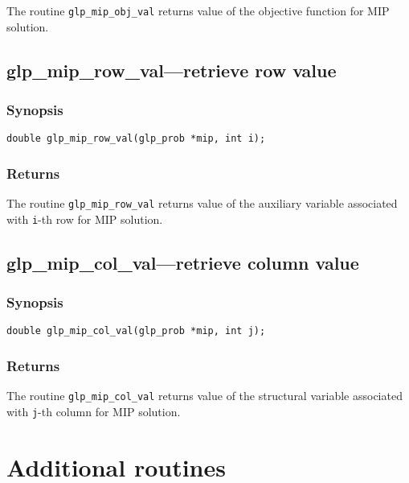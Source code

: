 The routine \verb|glp_mip_obj_val| returns value of the objective
function for MIP solution.

\subsection{glp\_mip\_row\_val---retrieve row value}

\subsubsection*{Synopsis}

\begin{verbatim}
double glp_mip_row_val(glp_prob *mip, int i);
\end{verbatim}

\subsubsection*{Returns}

The routine \verb|glp_mip_row_val| returns value of the auxiliary
variable associated with \verb|i|-th row for MIP solution.

\subsection{glp\_mip\_col\_val---retrieve column value}

\subsubsection*{Synopsis}

\begin{verbatim}
double glp_mip_col_val(glp_prob *mip, int j);
\end{verbatim}

\subsubsection*{Returns}

The routine \verb|glp_mip_col_val| returns value of the structural
variable associated with \verb|j|-th column for MIP solution.


\newpage

\section{Additional routines}

